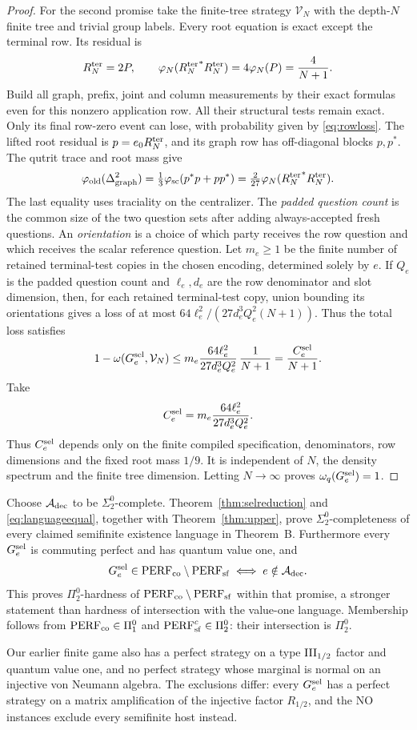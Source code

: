 \begin{proof}
For the second promise take the finite-tree strategy $\mathcal V_N$ with the depth-$N$ finite tree and trivial group labels. Every root equation is exact except the terminal row. Its residual is
\begin{equation}\label{eq:residual}
 {R^{\rm ter}_N}=2P,\qquad
 \varphi_N({R^{\rm ter}_N}^*{R^{\rm ter}_N})=4\varphi_N(P)=\frac4{N+1}.
\end{equation}
Build all graph, prefix, joint and column measurements by their exact formulas even for this nonzero application row. All their structural tests remain exact. Only its final row-zero event can lose, with probability given by \eqref{eq:rowloss}. The lifted root residual is $p=e_0{R^{\rm ter}_N}$, and its graph row has off-diagonal blocks $p,p^*$. The qutrit trace and root mass give
\[
 \varphi_{\rm old}(\Delta_{\rm graph}^2)
 =\tfrac13\varphi_{\rm sc}(p^*p+pp^*)
 =\tfrac{2}{27}\varphi_N({R^{\rm ter}_N}^*{R^{\rm ter}_N}).
\]
The last equality uses traciality on the centralizer. The \emph{padded question count} is the common size of the two question sets after adding always-accepted fresh questions. An \emph{orientation} is a choice of which party receives the row question and which receives the scalar reference question. Let $m_e\geq1$ be the finite number of retained terminal-test copies in the chosen encoding, determined solely by $e$. If $Q_e$ is the padded question count and $\ell_e,d_e$ are the row denominator and slot dimension, then, for each retained terminal-test copy, union bounding its orientations gives a loss of at most $64\ell_e^2/(27d_e^3Q_e^2(N+1))$. Thus the total loss satisfies
\[
 1-\omega(G^{\rm sel}_e,\mathcal V_N)
 \le m_e\frac{64\ell_e^2}{27d_e^3Q_e^2}\,\frac1{N+1}=\frac{C^{\rm sel}_e}{N+1}.
\]
Take
\[
 C^{\rm sel}_e=m_e\frac{64\ell_e^2}{27d_e^3Q_e^2}.
\]
Thus $C^{\rm sel}_e$ depends only on the finite compiled specification, denominators, row dimensions and the fixed root mass $1/9$. It is independent of $N$, the density spectrum and the finite tree dimension. Letting $N\to\infty$ proves $\omega_q(G^{\rm sel}_e)=1$.
\end{proof}

Choose $\mathcal A_{\rm dec}$ to be $\Sigma^0_2$-complete. Theorem~\ref{thm:selreduction} and \eqref{eq:languageequal}, together with Theorem~\ref{thm:upper}, prove $\Sigma^0_2$-completeness of every claimed semifinite existence language in Theorem~B. Furthermore every $G^{\rm sel}_e$ is commuting perfect and has quantum value one, and
\[
 G^{\rm sel}_e\in\mathrm{PERF}_{\mathrm{co}}\setminus\mathrm{PERF}_{\mathrm{sf}}\iff e\notin\mathcal A_{\rm dec}.
\]
This proves $\Pi^0_2$-hardness of $\mathrm{PERF}_{\mathrm{co}}\setminus\mathrm{PERF}_{\mathrm{sf}}$ within that promise, a stronger statement than hardness of intersection with the value-one language. Membership follows from $\mathrm{PERF}_{\mathrm{co}}\in\Pi^0_1$ and $\mathrm{PERF}_{\mathrm{sf}}^c\in\Pi^0_2$: their intersection is $\Pi^0_2$.

Our earlier finite game \cite{Hyperfinite} also has a perfect strategy on a type $\mathrm{III}_{1/2}$ factor and quantum value one, and no perfect strategy whose marginal is normal on an injective von Neumann algebra. The exclusions differ: every $G^{\rm sel}_e$ has a perfect strategy on a matrix amplification of the injective factor $R_{1/2}$, and the NO instances exclude every semifinite host instead.
